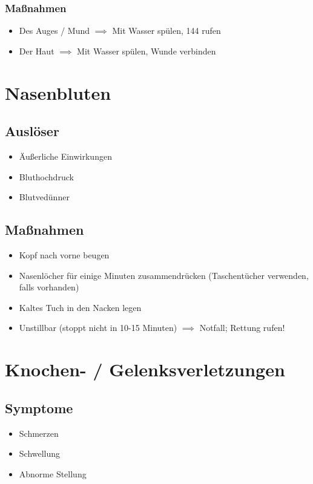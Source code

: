 \subsection*{Maßnahmen}
\begin{itemize}
    \item Des Auges / Mund $\implies$ Mit Wasser spülen, 144 rufen
    \item Der Haut $\implies$ Mit Wasser spülen, Wunde verbinden
\end{itemize}

\chapter{Nasenbluten}

\section*{Auslöser}
\begin{itemize}
    \item Äußerliche Einwirkungen
    \item Bluthochdruck
    \item Blutvedünner
\end{itemize}

\section*{Maßnahmen}
\begin{itemize}
    \item Kopf nach vorne beugen
    \item Nasenlöcher für einige Minuten zusammendrücken (Taschentücher verwenden, falls vorhanden)
    \item Kaltes Tuch in den Nacken legen
    \item Unstillbar (stoppt nicht in 10-15 Minuten) $\implies$ Notfall; Rettung rufen!
\end{itemize}

\chapter{Knochen- / Gelenksverletzungen}
\section*{Symptome}
\begin{itemize}
    \item Schmerzen
    \item Schwellung
    \item Abnorme Stellung
\end{itemize}
